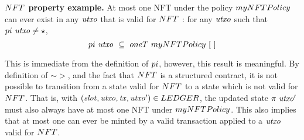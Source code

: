 
\textbf{$\fun{NFT}$ property example.}
At most one NFT under the policy $\fun{myNFTPolicy}$ can ever exist in any
$\mathit{utxo}$ that is valid for $\NFT$ :
for any $\mathit{utxo}$ such that $\fun{pi}~\var{utxo} \neq \emptytype$,
\[ \fun{pi}~\var{utxo}~\subseteq~ \fun{oneT}~\fun{myNFTPolicy}~[~] \]

This is immediate from the definition of $\fun{pi}$, however, this result is
meaningful. By definition of $\sim >$, and the fact
that $\NFT$ is a structured contract, it is not possible
to transition from a state valid for $\NFT$ to a state which is not valid for $\NFT$. That is,
with $(\var{slot}, \var{utxo}, \var{tx}, \var{utxo'}) \in \LEDGER$, the
updated state $\pi~\mathit{utxo'}$ must also always have at most one NFT under $\fun{myNFTPolicy}$.
This also implies that at most one can ever be minted by a valid transaction
applied to a $\mathit{utxo}$ valid for $\NFT$.
%
%
%
%
